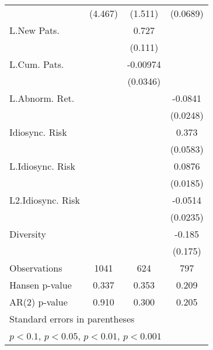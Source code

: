 \begin{table}
\begin{center}
{\begin{tabular}{l*{3}{c}}
                    &     (4.467)         &     (1.511)         &    (0.0689)         \\
L.New Pats.         &                     &       0.727\sym{***}&                     \\
                    &                     &     (0.111)         &                     \\
L.Cum. Pats.        &                     &    -0.00974         &                     \\
                    &                     &    (0.0346)         &                     \\
L.Abnorm. Ret.      &                     &                     &     -0.0841\sym{***}\\
                    &                     &                     &    (0.0248)         \\
Idiosync. Risk      &                     &                     &       0.373\sym{***}\\
                    &                     &                     &    (0.0583)         \\
L.Idiosync. Risk    &                     &                     &      0.0876\sym{***}\\
                    &                     &                     &    (0.0185)         \\
L2.Idiosync. Risk   &                     &                     &     -0.0514\sym{*}  \\
                    &                     &                     &    (0.0235)         \\
Diversity           &                     &                     &      -0.185         \\
                    &                     &                     &     (0.175)         \\
\hline
Observations        &        1041         &         624         &         797         \\
Hansen p-value             &       0.337         &       0.353         &       0.209         \\
AR(2) p-value                &       0.910         &       0.300         &       0.205         \\
\hline\hline
\multicolumn{4}{l}{\footnotesize Standard errors in parentheses}\\
\multicolumn{4}{l}{\footnotesize \sym{+} \(p<0.1\), \sym{*} \(p<0.05\), \sym{**} \(p<0.01\), \sym{***} \(p<0.001\)}\\
\end{tabular}
}

\end{center}
\end{table}


